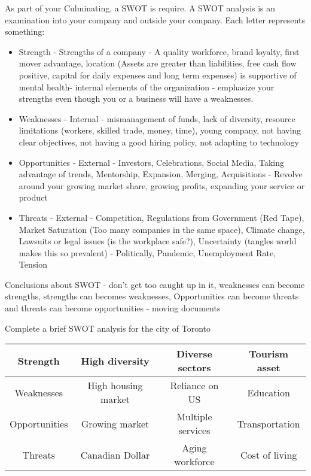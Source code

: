 \documentclass[11pt]{article}
\begin{document}
As part of your Culminating, a SWOT is require. A SWOT analysis is an examination into your company and outside your company. Each letter represents something:

\begin{itemize}
    \item Strength - Strengths of a company - A quality workforce, brand loyalty, first mover advantage, location (Assets are greater than liabilities, free cash flow positive, capital for daily expenses and long term expenses) is supportive of mental health- internal elements of the organization - emphasize your strengths even though you or a business will have a weaknesses. 
    \item Weaknesses - Internal - mismanagement of funds, lack of diversity, resource limitations (workers, skilled trade, money, time), young company, not having clear objectives, not having a good hiring policy, not adapting to technology
    \item Opportunities - External - Investors, Celebrations, Social Media, Taking advantage of trends, Mentorship, Expansion, Merging, Acquisitions - Revolve around your growing market share, growing profits, expanding your service or product
    \item Threats - External - Competition, Regulations from Government (Red Tape), Market Saturation (Too many companies in the same space), Climate change, Lawsuits or legal issues (is the workplace safe?), Uncertainty (tangles world makes this so prevalent) - Politically, Pandemic, Unemployment Rate, Tension
\end{itemize}

Conclusions about SWOT - don't get too caught up in it, weaknesses can become strengths, strengths can becomes weaknesses, Opportunities can become threats and threats can become opportunities - moving documents

Complete a brief SWOT analysis for the city of Toronto

\begin{tabular}{|c|c|c|c|}
    Strength & High diversity & Diverse sectors & Tourism asset \\
    \hline
    Weaknesses & High housing market & Reliance on US & Education\\
    \hline
    Opportunities & Growing market & Multiple services & Transportation\\
    \hline
    Threats & Canadian Dollar & Aging workforce & Cost of living\\
    \hline
\end{tabular}
\end{document}
